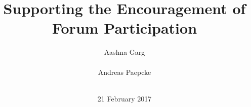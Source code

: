 \documentclass{edm_template}
\begin{document}
\title{Supporting the Encouragement of Forum Participation}
%
%
%
%
%

%
\author{
%
%
\alignauthor Aashna Garg \\
        \\
\alignauthor Andreas Paepcke \\
        \\
} %
\date{21 February 2017}
\end{document}
